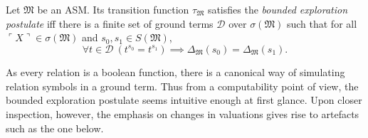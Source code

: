 \documentclass[12pt]{article}
\numberwithin{equation}{section}
\begin{document}
\begin{defi}\label{def217}
Let $\mathfrak{M}$ be an ASM. Its transition function $\tau_{\mathfrak{M}}$ satisfies the \emph{bounded exploration postulate} iff there is a finite set of ground terms $\mathcal{D}$ over $\sigma(\mathfrak{M})$ such that for all $\ulcorner X \urcorner \in \sigma(\mathfrak{M})$ and $s_0, s_1 \in S(\mathfrak{M})$,
\begin{equation*}
    \forall t \in \mathcal{D} \ (t^{s_0} = t^{s_1}) \implies \Delta_{\mathfrak{M}}(s_0) = \Delta_{\mathfrak{M}}(s_1) \text{.}
\end{equation*}
\end{defi}

As every relation is a boolean function, there is a canonical way of simulating relation symbols in a ground term. Thus from a computability point of view, the bounded exploration postulate seems intuitive enough at first glance. Upon closer inspection, however, the emphasis on changes in valuations gives rise to artefacts such as the one below.
\end{document}
